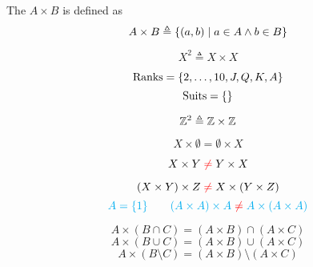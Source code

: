 
\begin{frame}{}
  \begin{definition}
    The  $A \times B$ 
    is defined as
    \[
      {A \times B \triangleq \{(a, b) \mid a \in A \land b \in B\}}
    \]
  \end{definition}

  \pause
  \[
    X^2 \triangleq X \times X
  \]

  \pause
\end{frame}

\begin{frame}{}
  \[
    \text{Ranks} = \{2, \dots, 10, J, Q, K, A\}
  \]
  \[
    \text{Suits} = \{\}
  \]
\end{frame}

\begin{frame}{}
  \[
    \mathbb{Z}^{2} \triangleq \mathbb{Z} \times \mathbb{Z}
  \]
\end{frame}

\begin{frame}{}
  \[
    X \times \emptyset = \emptyset \times X
  \]

  \pause
  \[
    X \times Y \;\textcolor{red}{\neq}\; Y \times X
  \]

  \pause
  \[
    (X \times Y) \times Z \;\textcolor{red}{\neq}\; X \times (Y \times Z)
  \]
  \pause
  \[
    \textcolor{cyan}{A = \{1\} \qquad (A \times A) \times A \;\textcolor{red}{\neq}\; A \times (A \times A)}
  \]
\end{frame}

\begin{frame}{}
  \begin{theorem}
    \[
      A \times (B \cap C) = (A \times B) \cap (A \times C)
    \]
    \[
      A \times (B \cup C) = (A \times B) \cup (A \times C)
    \]
    \[
      A \times (B \setminus C) = (A \times B) \setminus (A \times C)
    \]
  \end{theorem}

  \pause
\end{frame}

